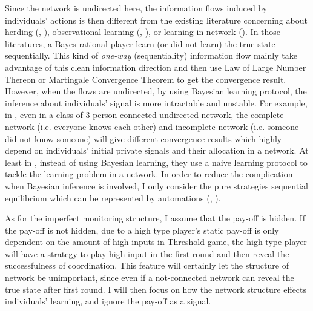 \documentclass[12pt,letter]{article}
\theoremstyle{remark}
\theoremstyle{remark}
\theoremstyle{claim}
\begin{document}
Since the network is undirected here, the information flows induced by individuals' actions is then different from the existing literature concerning about herding (\cite{Banerjee1992}, \cite{BHW1992}), observational learning (\cite{SS2000}, \cite{CK2004}), or learning in network (\citep{OADL2011}). In those literatures, a Bayes-rational player learn (or did not learn) the true state sequentially. This kind of \textit{one-way} (sequentiality) information flow mainly take advantage of this clean information direction and then use Law of Large Number Thereon or Martingale Convergence Theorem to get the convergence result. However, when the flows are undirected, by using Bayesian learning protocol, the inference about individuals' signal is more intractable and unstable. For example, in \cite{GK2003},  even in a class of 3-person connected undirected network, the complete network (i.e. everyone knows each other) and incomplete network (i.e. someone did not know someone) will give different convergence results which highly depend on individuals' initial private signals and their allocation in a network. At least in \cite{GJ2007}, instead of using Bayesian learning, they use a naive learning protocol to tackle the learning problem in a network. In order to reduce the complication when Bayesian inference is involved, I only consider the pure strategies sequential equilibrium which can be represented by automations (\cite{AR1988}, \cite{rubinstein1986}). 

As for the imperfect monitoring structure, I assume that the pay-off is hidden. If the pay-off is not hidden, due to a high type player's static pay-off is only dependent on the amount of high inputs in Threshold game, the high type player will have a strategy to play high input in the first round and then reveal the successfulness of coordination. This feature will certainly let the structure of network be unimportant, since even if a not-connected network can reveal the true state after first round. I will then focus on how the network structure effects individuals' learning, and ignore the pay-off as a signal. 
\end{document}
